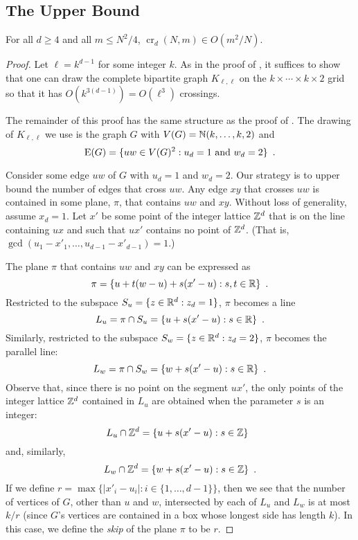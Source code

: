 \documentclass{patmorin}
\newcommand{\n}{N}
\DeclareMathOperator{\crs}{cr}
\begin{document}
\subsection{The Upper Bound}

\begin{thm}
  For all $d\ge 4$ and all $m\le\n^2/4$, $\crs_d(\n,m)\in O(m^2/\n)$.
\end{thm}

\begin{proof}
  Let $\ell=k^{d-1}$ for some integer $k$.  As in the proof of
  , it suffices to show that one can draw the
  complete bipartite graph $K_{\ell,\ell}$ on the $k\times\cdots\times
  k\times 2$ grid so that it has $O(k^{3(d-1)})=O(\ell^3)$ crossings.

  The remainder of this proof has the same structure as the proof of
  .  The drawing of $K_{\ell,\ell}$ we use is the graph
  $G$ with $V(G)=\mathbb{N}(k,\ldots,k,2)$ and
  \[
    \mathrm{E}(G) = \{ uw\in V(G)^2 :\mbox{$u_d = 1$ and $w_d = 2$} \} \enspace .
  \]
  
  Consider some edge $uw$ of $G$ with $u_d=1$ and $w_d=2$.  Our strategy
  is to upper bound the number of edges that cross $uw$.  Any edge $xy$
  that crosses $uw$ is contained in some plane, $\pi$, that contains $uw$
  and $xy$.  Without loss of generality, assume $x_d=1$.  Let $x'$ be some
  point of the integer lattice $\mathbb{Z}^d$ that is on the line containing
  $ux$ and such that $ux'$ contains no point of $\mathbb{Z}^d$. (That is,
  $\gcd(u_1-x'_1,\ldots,u_{d-1}-x'_{d-1}) = 1$.)

  The plane $\pi$ that contains $uw$ and $xy$ can be expressed as
  \[
     \pi = \{ u + t(w-u) + s(x'-u) : s,t\in\mathbb{R}\} \enspace .
  \]
  Restricted to the subspace $S_u=\{z\in\mathbb{R}^d: z_d=1\}$, $\pi$
  becomes a line
  \[
     L_u = \pi\cap S_u = \{ u + s(x'-u) : s\in\mathbb{R}\} \enspace .
  \]
  Similarly, restricted to the subspace $S_w=\{z\in\mathbb{R}^d: z_d=2\}$,
  $\pi$ becomes the parallel line:
  \[
     L_w = \pi\cap S_w = \{ w + s(x'-u) : s\in\mathbb{R}\} \enspace .
  \]
  Observe that, since there is no point on the segment $ux'$, the only
  points of the integer lattice $\mathbb{Z}^d$ contained in $L_u$ are obtained
  when the parameter $s$ is an integer:
  \[
     L_u\cap\mathbb{Z}^d = \{ u + s(x'-u) : s\in\mathbb{Z}\} \enspace 
  \]
  and, similarly,
  \[
     L_w\cap\mathbb{Z}^d = \{ w + s(x'-u) : s\in\mathbb{Z}\} \enspace  .
  \]
  If we define $r=\max\{|x'_i-u_i| : i\in\{1,\ldots,d-1\}\}$, then we see
  that the number of vertices of $G$, other than $u$ and $w$, intersected
  by each of $L_u$ and $L_w$ is at most $k/r$ (since $G$'s vertices are
  contained in a box whose longest side has length $k$).  In this case,
  we define the \emph{skip} of the plane $\pi$ to be $r$.
  

\end{proof}
\end{document}
